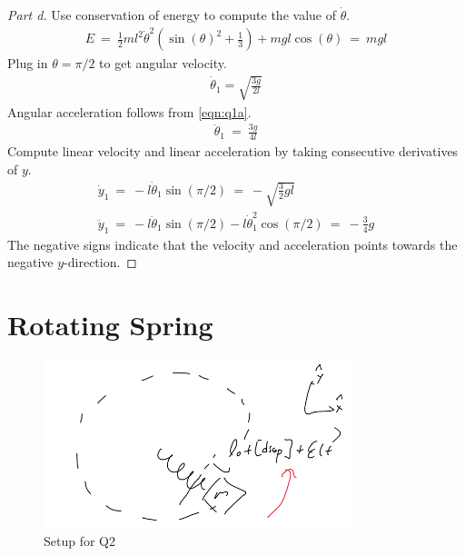 \documentclass{article}
\numberwithin{equation}{section}
\begin{document}
\begin{proof}[Part d]
    Use conservation of energy to compute the value of $\dot \theta$. 
    \begin{align}
        E \ = \ \frac 1 2 m l^2 \dot \theta^2 \left(
            \sin(\theta)^2 + \frac 1 3
        \right) + mgl \cos(\theta) \ = \ mgl
    \end{align}
    Plug in $\theta = \pi / 2$ to get angular velocity. 
    \begin{align}
        \dot \theta_1 = \sqrt{\frac {3g}{2l}}
    \end{align}
    Angular acceleration follows from \eqref{eqn:q1a}. 
    \begin{align}
        \ddot \theta_1 \ = \ \frac {3g}{4l}
    \end{align}
    Compute linear velocity and linear acceleration by taking 
    consecutive derivatives of $y$. 
    \begin{align}\boxed{
        \dot y_1 \ = \ -l \dot \theta_1 \sin(\pi/2) \ = \ -\sqrt{\frac 3 2 gl} }\\\boxed{ 
        \ddot y_1 \ = \ -l \ddot \theta_1 \sin(\pi/2) - l \dot\theta^2_1 \cos(\pi/2) \ = \ -\frac 3 4 g}
    \end{align}
    The negative signs indicate that the velocity and acceleration points 
    towards the negative $y$-direction. 
\end{proof}


\section{Rotating Spring}
\begin{figure}[htp]
    \centering
    \includegraphics[width=0.8\textwidth]{Q2_figure.png} %
    \caption{Setup for Q2}
    \label{fig:q2setup}
\end{figure}
\end{document}

